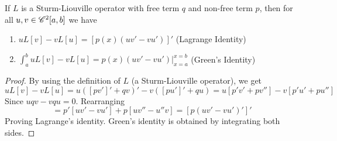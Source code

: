\begin{lemma}
  If $L$ is a Sturm-Liouville operator with free term $q$ and non-free term $p$, then for
  all $u,v\in\mathscr C^2[a,b]$ we have 
  \begin{enumerate}
    \item $uL[v]-vL[u] = [p(x)(uv'-vu')]'$ (Lagrange Identity)
    \item $\int_a^b uL[v]-vL[u] = p(x)(uv'-vu')\Big|^{x=b}_{x=a}$ (Green's Identity)
  \end{enumerate}
  \label{<+label+>}
\end{lemma}
\begin{proof}
  By using the definition of $L$ (a Sturm-Liouville operator), we get 
  \[uL[v]-vL[u] = u([pv']'+qv)'- v([pu']'+qu) = u[p'v'+pv'']-v[p'u'+pu'']\]
  Since $uqv-vqu=0$. Rearranging
  \[=p'[uv'-vu'] +p[uv''-u''v] = [p(uv'-vu')']'\]
  Proving Lagrange's identity. Green's identity is obtained by integrating both sides.
\end{proof}
